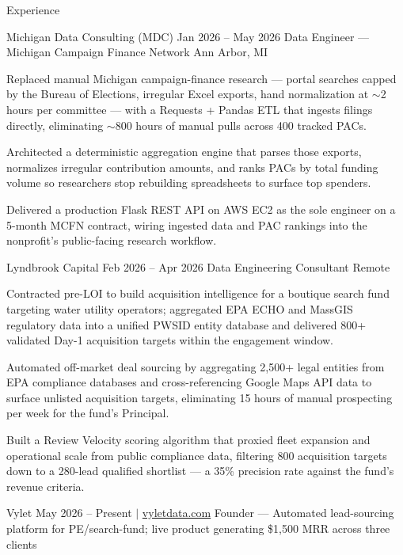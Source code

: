 \documentclass[
	11pt
]{../../../template}
\begin{document}
	\begin{rSection}{E}{xperience}
		\begin{rSectionEntry}
			{Michigan Data Consulting (MDC)}
			{Jan 2026 -- May 2026}
			{Data Engineer --- Michigan Campaign Finance Network}
			{}
			{Ann Arbor, MI}

			\item Replaced manual Michigan campaign-finance research --- portal searches capped by the Bureau of Elections, irregular Excel exports, hand normalization at $\sim$2 hours per committee --- with a Requests + Pandas ETL that ingests filings directly, eliminating $\sim$800 hours of manual pulls across 400 tracked PACs.
			\item Architected a deterministic aggregation engine that parses those exports, normalizes irregular contribution amounts, and ranks PACs by total funding volume so researchers stop rebuilding spreadsheets to surface top spenders.
			\item Delivered a production Flask REST API on AWS EC2 as the sole engineer on a 5-month MCFN contract, wiring ingested data and PAC rankings into the nonprofit's public-facing research workflow.
		\end{rSectionEntry}

		\begin{rSectionEntry}
			{Lyndbrook Capital}
			{Feb 2026 -- Apr 2026}
			{Data Engineering Consultant}
			{}
			{Remote}

			\item Contracted pre-LOI to build acquisition intelligence for a boutique search fund targeting water utility operators; aggregated EPA ECHO and MassGIS regulatory data into a unified PWSID entity database and delivered 800+ validated Day-1 acquisition targets within the engagement window.
			\item Automated off-market deal sourcing by aggregating 2,500+ legal entities from EPA compliance databases and cross-referencing Google Maps API data to surface unlisted acquisition targets, eliminating 15 hours of manual prospecting per week for the fund's Principal.
			\item Built a Review Velocity scoring algorithm that proxied fleet expansion and operational scale from public compliance data, filtering 800 acquisition targets down to a 280-lead qualified shortlist --- a 35\% precision rate against the fund's revenue criteria.
		\end{rSectionEntry}

		\begin{rSectionEntry}
			{Vylet}
			{May 2026 -- Present $\vert$ \href{https://vyletdata.com}{vyletdata.com}}
			{Founder --- Automated lead-sourcing platform for PE/search-fund; live product generating \$1,500 MRR across three clients}
			{}
			{}


\end{rSectionEntry}
\end{rSection}
\end{document}
